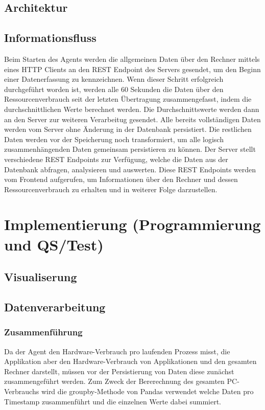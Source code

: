 \documentclass{report}
\begin{document}
\section{Architektur}
\section{Informationsfluss}
Beim Starten des Agents werden die allgemeinen Daten über den Rechner mittels eines HTTP Clients an den REST Endpoint des Servers gesendet, um den Beginn einer Datenerfassung zu kennzeichnen. Wenn dieser Schritt erfolgreich durchgeführt worden ist, werden alle 60 Sekunden die Daten über den Ressourcenverbrauch seit der letzten Übertragung zusammengefasst, indem die durchschnittlichen Werte berechnet werden. Die Durchschnittswerte werden dann an den Server zur weiteren Verarbeitug gesendet.
Alle bereits vollständigen Daten werden vom Server ohne Änderung in der Datenbank persistiert. Die restlichen Daten werden vor der Speicherung noch transformiert, um alle logisch zusammenhängenden Daten gemeinsam persistieren zu können.
Der Server stellt verschiedene REST Endpoints zur Verfügung, welche die Daten aus der Datenbank abfragen, analysieren und auswerten.
Diese REST Endpoints werden vom Frontend aufgerufen, um Informationen über den Rechner und dessen Ressourcenverbrauch zu erhalten und in weiterer Folge darzustellen.

\chapter{Implementierung (Programmierung und QS/Test)}
\section{Visualiserung}
\section{Datenverarbeitung}
\subsection{Zusammenführung}
Da der Agent den Hardware-Verbrauch pro laufenden Prozess misst, die Applikation aber den Hardware-Verbrauch von Applikationen und den gesamten Rechner darstellt, müssen vor der Persistierung von Daten diese zunächst zusammengeführt werden. Zum Zweck der Bererechnung des gesamten PC-Verbrauchs wird die groupby-Methode von Pandas verwendet welche Daten pro Timestamp zusammenführt und die einzelnen Werte dabei summiert.
\end{document}
